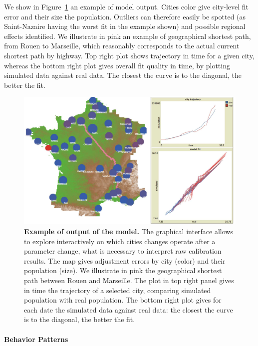 \documentclass[Royal,sageh,times]{sagej}
\begin{document}
We show in Figure~\ref{fig:interface} an example of model output. Cities color give city-level fit error and their size the population. Outliers can therefore easily be spotted (as Saint-Nazaire having the worst fit in the example shown) and possible regional effects identified. We illustrate in pink an example of geographical shortest path, from Rouen to Marseille, which reasonably corresponds to the actual current shortest path by highway. Top right plot shows trajectory in time for a given city, whereas the bottom right plot gives overall fit quality in time, by plotting simulated data against real data. The closest the curve is to the diagonal, the better the fit.


\begin{figure}
\centering
\includegraphics[width=\textwidth]{figures/Fig2.jpg}
\caption{\textbf{Example of output of the model.} The graphical interface allows to explore interactively on which cities changes operate after a parameter change, what is necessary to interpret raw calibration results. The map gives adjustment errors by city (color) and their population (size). We illustrate in pink the geographical shortest path between Rouen and Marseille. The plot in top right panel gives in time the trajectory of a selected city, comparing simulated population with real population. The bottom right plot gives for each date the simulated data against real data: the closest the curve is to the diagonal, the better the fit.}
\label{fig:interface}
\end{figure}


\paragraph{Behavior Patterns}
\end{document}
